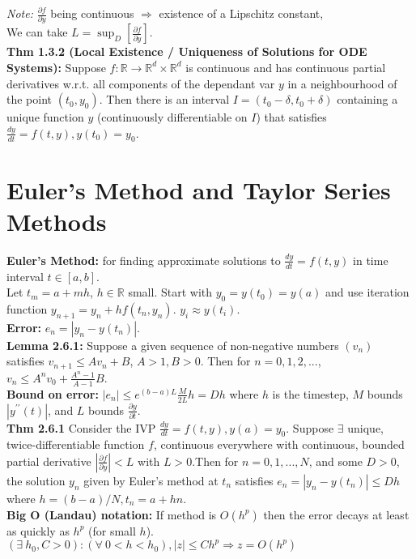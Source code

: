 \documentclass[10pt,a4paper]{article}
\newcommand{\R}{\mathbb{R}}
\renewcommand{\implies}{\Rightarrow}
\newcommand{\del}{\partial}
\begin{document}
\begin{multicols*}{2}
\textit{Note:} $\frac{\del f}{\del y}$ being continuous $\implies$ existence of a Lipschitz constant,\\
We can take $L = \sup_D\left[\frac{\del f}{\del y}\right]$.\\
\textbf{Thm 1.3.2 (Local Existence / Uniqueness of Solutions for ODE Systems):} Suppose $f : \R \to \R^d \times \R^d$ is continuous and has continuous partial derivatives w.r.t. all components of the dependant var $y$ in a neighbourhood of the point $(t_0, y_0)$. Then there is an interval $I = (t_0 - \delta, t_0 + \delta)$ containing a unique function $y$ (continuously differentiable on $I$) that satisfies $\frac{dy}{dt} = f(t,y), y(t_0)  = y_0$.\\


\section{Euler's Method and Taylor Series Methods}
\textbf{Euler's Method:} for finding approximate solutions to $\frac{dy}{dt} = f(t,y)$ in time interval $t \in [a,b]$. \\ Let $t_m = a + mh$, $h \in \R$ small. Start with $y_0 = y(t_0) = y(a)$ and use iteration function $\boxed{y_{n + 1} = y_n + hf(t_n, y_n)}$. $y_i \approx y(t_i)$.\\
\textbf{Error:} $\boxed{e_n = |y_n - y(t_n)|}$.\\
\textbf{Lemma 2.6.1:} Suppose a given sequence of non-negative numbers $(v_n)$ satisfies $v_{n + 1} \leq Av_n + B$, $A > 1, B > 0$. Then for $n = 0,1,2,...$, $\boxed{v_n \leq A^nv_0 + \frac{A^n - 1}{A - 1}B}$.\\
\textbf{Bound on error:} $\boxed{|e_n| \leq e^{(b-a)L}\frac{M}{2L}h = Dh}$ where $h$ is the timestep, $M$ bounds $|y^{\prime\prime}(t)|$, and $L$ bounds $\frac{\del y}{\del t}$.\\
\textbf{Thm 2.6.1} Consider the IVP $\frac{dy}{dt} = f(t,y), y(a) = y_0$. Suppose $\exists$ unique, twice-differentiable function $f$, continuous everywhere with continuous, bounded partial derivative $\left|\frac{\del f}{\del y}\right| < L$ with $L > 0$.Then for $n = 0,1,...,N$, and some $D > 0$, the solution $y_n$ given by Euler's method at $t_n$ satisfies $\boxed{e_n = |y_n - y(t_n)| \leq Dh}$ where $h = (b-a)/N, t_n = a + hn$.\\
\textbf{Big O (Landau) notation:} If method is $O(h^p)$ then the error decays at least as quickly as $h^p$ (for small $h$).\\
$\boxed{(\exists \: h_0, C > 0):( \forall \: 0 < h < h_0), |z|\leq Ch^p \implies z = O(h^p) }$\\

\end{multicols*}
\end{document}
